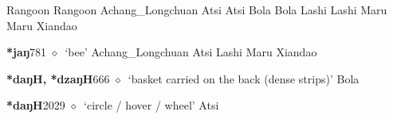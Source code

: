 \begin{list}{}{\leftmargin=1.5em \itemindent=-1.5em}
\hspace{1ex}
         Rangoon 
\hspace{1ex}
         Rangoon 
\hspace{1ex}
         Achang\_Longchuan 
\hspace{1ex}
         Atsi 
\hspace{1ex}
         Atsi 
\hspace{1ex}
         Bola 
\hspace{1ex}
         Bola 
\hspace{1ex}
         Lashi 
\hspace{1ex}
         Lashi 
\hspace{1ex}
         Maru 
\hspace{1ex}
         Maru 
\hspace{1ex}
         Xiandao 
  \item {\footnotesize \textbf{*jaŋ}}{\tiny 781}
\hspace{1ex}
         $\diamond$~`bee'
         Achang\_Longchuan 
\hspace{1ex}
         Atsi 
\hspace{1ex}
         Lashi 
\hspace{1ex}
         Maru 
\hspace{1ex}
         Xiandao 
  \item {\footnotesize \textbf{*daŋH, *dzaŋH}}{\tiny 666}
\hspace{1ex}
         $\diamond$~`basket carried on the back (dense strips)'
         Bola 
  \item {\footnotesize \textbf{*daŋH}}{\tiny 2029}
\hspace{1ex}
         $\diamond$~`circle / hover / wheel'
         Atsi 

\end{list}
